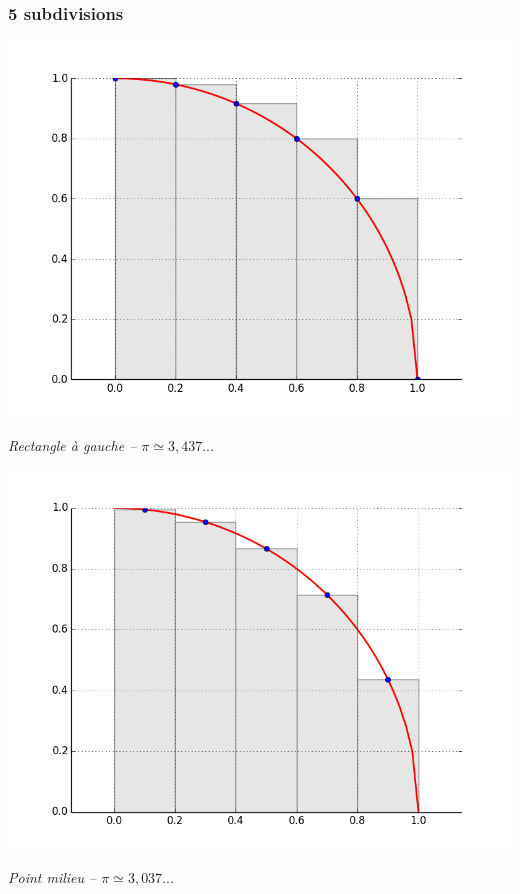 \documentclass[10pt,fleqn]{article} %
\begin{document}
\subsubsection*{5 subdivisions}

\begin{minipage}[c]{.32\linewidth}
\begin{center}
\includegraphics[width=.99\textwidth]{images/CourbesPython/pi_rect_g}

\textit{Rectangle à gauche -- $\pi \simeq 3,437...$  }
\end{center}
\end{minipage}\hfill
\begin{minipage}[c]{.32\linewidth}
\begin{center}
\includegraphics[width=.99\textwidth]{images/CourbesPython/pi_rect_m}

\textit{Point milieu -- $\pi \simeq 3,037...$}
\end{center}
\end{minipage}\hfill
\end{document}
